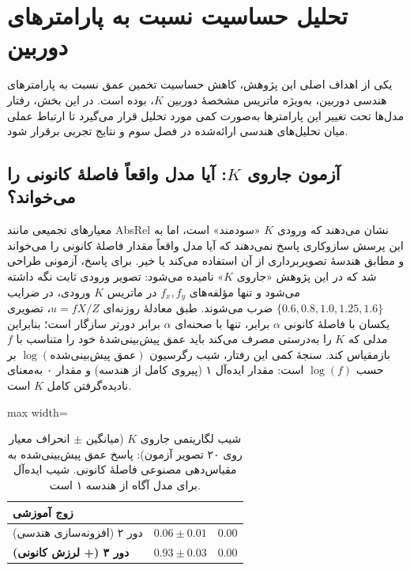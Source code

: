 \section{تحلیل حساسیت نسبت به پارامترهای دوربین}
\label{sec:camera_sensitivity}

یکی از اهداف اصلی این پژوهش،
کاهش حساسیت تخمین عمق نسبت به پارامترهای هندسی دوربین،
به‌ویژه ماتریس مشخصهٔ دوربین $K$،
بوده است.
در این بخش، رفتار مدل‌ها تحت تغییر این پارامترها
به‌صورت کمی مورد تحلیل قرار می‌گیرد
تا ارتباط عملی میان تحلیل‌های هندسی ارائه‌شده در فصل سوم
و نتایج تجربی برقرار شود.

\subsection{آزمون جاروی $K$: آیا مدل واقعاً فاصلهٔ کانونی را می‌خواند؟}
\label{subsec:intrinsics_variation}

معیارهای تجمیعی مانند AbsRel نشان می‌دهند که ورودی $K$ «سودمند» است، اما به این پرسش سازوکاری پاسخ نمی‌دهند که آیا مدل واقعاً مقدار فاصلهٔ کانونی را می‌خواند و مطابق هندسهٔ تصویربرداری از آن استفاده می‌کند یا خیر. برای پاسخ، آزمونی طراحی شد که در این پژوهش «جاروی $K$» نامیده می‌شود: تصویر ورودی ثابت نگه داشته می‌شود و تنها مؤلفه‌های $f_x, f_y$ در ماتریس $K$ ورودی، در ضرایب $\{0.6, 0.8, 1.0, 1.25, 1.6\}$ ضرب می‌شوند. طبق معادلهٔ روزنه‌ای $u = f X / Z$، تصویری یکسان با فاصلهٔ کانونی $\alpha$ برابر، تنها با صحنه‌ای $\alpha$ برابر دورتر سازگار است؛ بنابراین مدلی که $K$ را به‌درستی مصرف می‌کند باید عمق پیش‌بینی‌شدهٔ خود را متناسب با $f$ بازمقیاس کند. سنجهٔ کمی این رفتار، شیب رگرسیون $\log(\text{عمق پیش‌بینی‌شده})$ بر حسب $\log(f)$ است: مقدار ایده‌آل ۱ (پیروی کامل از هندسه) و مقدار ۰ به‌معنای نادیده‌گرفتن کامل $K$ است.

\begin{table}[htbp]
\centering
\caption{شیب لگاریتمی جاروی $K$ (میانگین $\pm$ انحراف معیار روی ۲۰ تصویر آزمون): پاسخ عمق پیش‌بینی‌شده به مقیاس‌دهی مصنوعی فاصلهٔ کانونی. شیب ایده‌آل برای مدل آگاه از هندسه ۱ است.}
\label{tab:k_sweep_slopes}
\begin{adjustbox}{max width=\textwidth}
\begin{tabular}{lcc}
\hline
زوج آموزشی & \tableproposedmodel{} & \tablecontrolmodel{} \\ \hline
دور ۲ (افزونه‌سازی هندسی) & $0.06 \pm 0.01$ & $0.00$ \\
\textbf{دور ۳ (+ لرزش کانونی)} & $\mathbf{0.93 \pm 0.03}$ & $0.00$ \\ \hline
\end{tabular}
\end{adjustbox}
\end{table}

